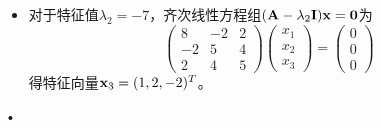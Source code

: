 \begin{frame}
  \begin{footnotesize}
\begin{itemize}
$\lambda_{1,2}=2$，齐次线性方程组$(\A-2\II)\xx=\zero$为
    $$
    \left(
      \begin{array}{rrr}
        -1&-2& 2\\
        -2&-3& 4\\
         2& 4&-4
      \end{array}
      \right)\left(
      \begin{array}{r}
        x_1\\
        x_2\\
        x_3
      \end{array}
      \right)=\left(
      \begin{array}{r}
        0\\
        0\\
        0
      \end{array}
      \right)
    $$
      得特征向量$\xx_1=(2,-1,0)^T,~~\xx_2=(2,0,1)^T$。 \\[0.1in]
\item 
对于特征值$\lambda_2=-7$，齐次线性方程组$(\mathbf{A}-\lambda_2\mathbf{I})\mathbf{x}=\mathbf{0}$为
    $$
    \left(
    \begin{array}{rrr}
      8&-2&2\\
      -2&5&4\\
      2&4&5
    \end{array}
    \right)\left(
    \begin{array}{r}
      x_1\\
      x_2\\
      x_3
      \end{array}
      \right)=\left(
      \begin{array}{r}
        0\\
        0\\
        0
      \end{array}
      \right)
    $$
      得特征向量$\mathbf{x}_3=(1,2,-2)^T$。
\end{itemize}•
    


  
  \end{footnotesize}
\end{frame}


